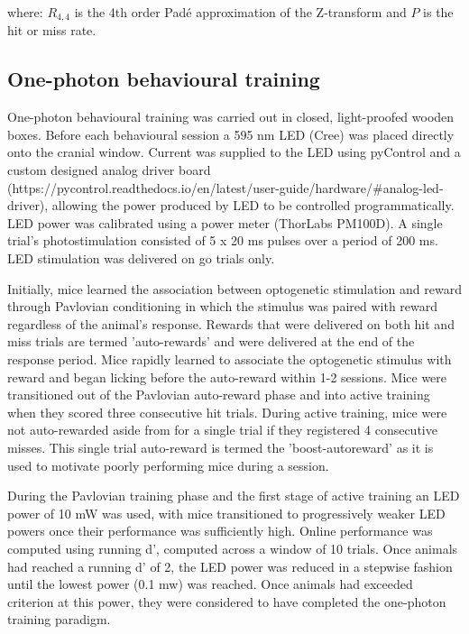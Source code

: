 where: $R_{4,4}$ is the 4th order Pad\'e approximation of the Z-transform and $P$ is the hit or miss rate.

\subsection{One-photon behavioural training}


One-photon behavioural training was carried out in closed, light-proofed wooden boxes. Before each behavioural session a 595 nm LED (Cree) was placed directly onto the cranial window. Current was supplied to the LED using pyControl and a custom designed analog driver board (https://pycontrol.readthedocs.io/en/latest/user-guide/hardware/#analog-led-driver), allowing the power produced by LED to be controlled programmatically. LED power was calibrated using a power meter (ThorLabs PM100D). A single trial's photostimulation consisted of 5 x 20 ms pulses over a period of 200 ms. LED stimulation was delivered on go trials only.

Initially, mice learned the association between optogenetic stimulation and reward through Pavlovian conditioning in which the stimulus was paired with reward regardless of the animal's response. Rewards that were delivered on both hit and miss trials are termed 'auto-rewards' and were delivered at the end of the response period. Mice rapidly learned to associate the optogenetic stimulus with reward and began licking before the auto-reward within 1-2 sessions. Mice were transitioned out of the Pavlovian auto-reward phase and into active training when they scored three consecutive hit trials. During active training, mice were not auto-rewarded aside from for a single trial if they registered 4 consecutive misses. This single trial auto-reward is termed the 'boost-autoreward' as it is used to motivate poorly performing mice during a session.

During the Pavlovian training phase and the first stage of active training an LED power of 10 mW was used, with mice transitioned to progressively weaker LED powers once their performance was sufficiently high. Online performance was computed using running d', computed across a window of 10 trials. Once animals had reached a running d' of 2, the LED power was reduced in a stepwise fashion until the lowest power (0.1 mw) was reached. Once animals had exceeded criterion at this power, they were considered to have completed the one-photon training paradigm.

